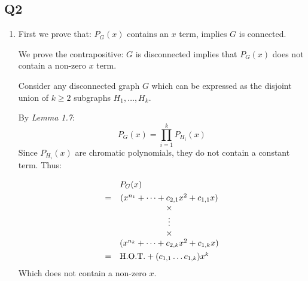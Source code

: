 \documentclass[a4paper, 11pt]{article}
\begin{document}
\begin{multicols*}{2}
	\section*{Q2}

	\begin{enumerate}[label=(\alph*)]
		\item

		      First we prove that: $P_G(x)$ contains an $x$ term, implies $G$ is connected.

		      \begin{mdframed}
			      We prove the contrapositive: $G$ is disconnected implies that $P_G(x)$ does not contain a non-zero $x$ term.

			      Consider any disconnected graph $G$ which can be expressed as the disjoint union of $k\geq2$ subgraphs $H_1,\dots,H_k$.

			      By \textit{Lemma 1.7}:
			      $$P_G(x)= \prod_{i=1}^k P_{H_i}(x)$$
			      Since $P_{H_i}(x)$ are chromatic polynomials, they do not contain a constant term. Thus:

			      \begin{align*}
				       & \begin{matrix}
					          & \hphantom{=} P_G(x) \\
				         \end{matrix}                         \\
				       & \begin{matrix}
					         = & (x^{n_1} + \dots + c_{2,1}x^2 + c_{1,1}x ) \\
					           & \times                                     \\
					           & \vdots                                     \\
					           & \times                                     \\
					           & (x^{n_k} + \dots + c_{2,k}x^2 + c_{1,k}x )
				         \end{matrix} \\
				       & \begin{matrix}
					         = & \text{H.O.T.} + (c_{1,1}\dots c_{1,k})x^k \\
				         \end{matrix}  \\
			      \end{align*}
			      Which does not contain a non-zero $x$.
		      \end{mdframed}



\end{enumerate}
\end{multicols*}
\end{document}

